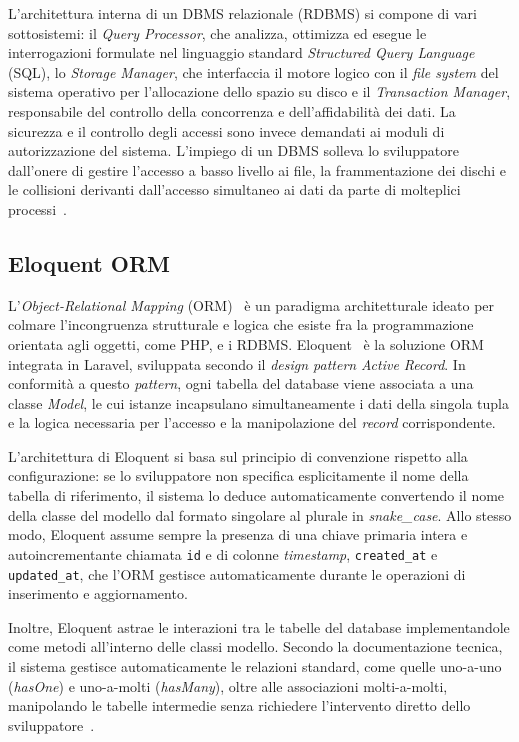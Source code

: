 L'architettura interna di un DBMS relazionale (RDBMS) si compone di vari sottosistemi: il \textit{Query Processor}, che analizza, ottimizza ed esegue le interrogazioni formulate nel linguaggio standard \textit{Structured Query Language} (SQL), lo \textit{Storage Manager}, che interfaccia il motore logico con il \textit{file system }del sistema operativo per l'allocazione dello spazio su disco e il \textit{Transaction Manager}, responsabile del controllo della concorrenza e dell'affidabilità dei dati. La sicurezza e il controllo degli accessi sono invece demandati ai moduli di autorizzazione del sistema. L'impiego di un DBMS solleva lo sviluppatore dall'onere di gestire l'accesso a basso livello ai file, la frammentazione dei dischi e le collisioni derivanti dall'accesso simultaneo ai dati da parte di molteplici processi~\autocite[ch. 1]{silberschatzDatabaseSystemConcepts2020}.

\subsection{Eloquent ORM}
L'\textit{Object-Relational Mapping} (ORM)~ è un paradigma architetturale ideato per colmare l'incongruenza strutturale e logica che esiste fra la programmazione orientata agli oggetti, come PHP, e i RDBMS. Eloquent~\autocite{Eloquent} è la soluzione ORM integrata in Laravel, sviluppata secondo il \textit{design pattern} \textit{Active Record}. In conformità a questo \textit{pattern}, ogni tabella del database viene associata a una classe \textit{Model}, le cui istanze incapsulano simultaneamente i dati della singola tupla e la logica necessaria per l'accesso e la manipolazione del \textit{record} corrispondente.

L'architettura di Eloquent si basa sul principio di convenzione rispetto alla configurazione: se lo sviluppatore non specifica esplicitamente il nome della tabella di riferimento, il sistema lo deduce automaticamente convertendo il nome della classe del modello dal formato singolare al plurale in \textit{snake\_case}. Allo stesso modo, Eloquent assume sempre la presenza di una chiave primaria intera e autoincrementante chiamata \texttt{id} e di colonne \textit{timestamp}, \texttt{created\_at} e \texttt{updated\_at}, che l'ORM gestisce automaticamente durante le operazioni di inserimento e aggiornamento.

Inoltre, Eloquent astrae le interazioni tra le tabelle del database implementandole come metodi all'interno delle classi modello. Secondo la documentazione tecnica, il sistema gestisce automaticamente le relazioni standard, come quelle uno-a-uno (\textit{hasOne}) e uno-a-molti (\textit{hasMany}), oltre alle associazioni molti-a-molti, manipolando le tabelle intermedie senza richiedere l'intervento diretto dello sviluppatore~\autocite{EloquentRelationshipsLaravel}.

